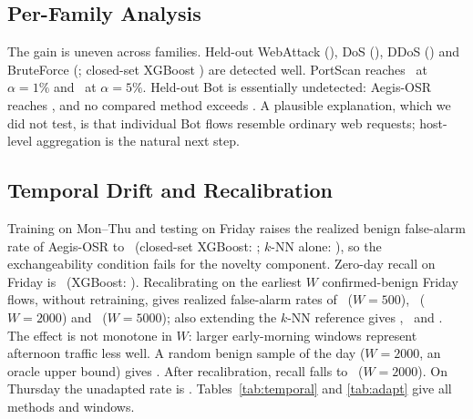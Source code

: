 \documentclass[conference]{IEEEtran}
\begin{document}


\subsection{Per-Family Analysis}
The gain is uneven across families. Held-out WebAttack (\LoafoOsrWebAttack), DoS (\LoafoOsrDoS), DDoS (\LoafoOsrDDoS) and BruteForce (\LoafoOsrBruteForce; closed-set XGBoost \LoafoXgbBruteForce) are detected well. PortScan reaches \LoafoOsrPortScan\ at $\alpha=1\%$ and \LoafoOsrPortScanAtFive\ at $\alpha=5\%$. Held-out Bot is essentially undetected: Aegis-OSR reaches \LoafoOsrBot, and no compared method exceeds \LoafoBotBestAny. A plausible explanation, which we did not test, is that individual Bot flows resemble ordinary web requests; host-level aggregation is the natural next step.

\subsection{Temporal Drift and Recalibration}\label{sec:temporal}
Training on Mon--Thu and testing on Friday raises the realized benign false-alarm rate of Aegis-OSR to \TempFriOsrFpr\ (closed-set XGBoost: \TempFriXgbFpr; $k$-NN alone: \TempFriKnnFpr), so the exchangeability condition fails for the novelty component. Zero-day recall on Friday is \TempFriOsrZdr\ (XGBoost: \TempFriXgbZdr). Recalibrating on the earliest $W$ confirmed-benign Friday flows, without retraining, gives realized false-alarm rates of \TempFriRecalFiveHFpr\ ($W=500$), \TempFriRecalTwoKFpr\ ($W=2000$) and \TempFriRecalFiveKFpr\ ($W=5000$); also extending the $k$-NN reference gives \TempFriRefFiveHFpr, \TempFriRefTwoKFpr\ and \TempFriRefFiveKFpr. The effect is not monotone in $W$: larger early-morning windows represent afternoon traffic less well. A random benign sample of the day ($W=2000$, an oracle upper bound) gives \TempFriOracleTwoKFpr. After recalibration, recall falls to \TempFriRecalTwoKZdr\ ($W=2000$). On Thursday the unadapted rate is \TempThuOsrFpr. Tables~\ref{tab:temporal} and \ref{tab:adapt} give all methods and windows.



\end{document}
